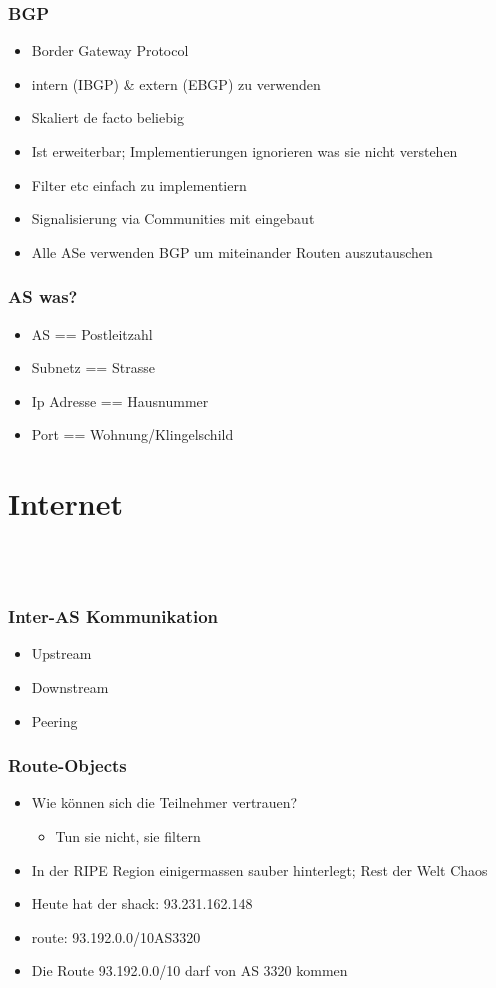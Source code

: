 \documentclass[t]{beamer}
\begin{document}
\begin{frame}
	\frametitle{BGP}
	\begin{itemize}
		\item Border Gateway Protocol
		\item intern (IBGP) \& extern (EBGP) zu verwenden
		\item Skaliert de facto beliebig
		\item Ist erweiterbar; Implementierungen ignorieren was sie nicht verstehen
		\item Filter etc einfach zu implementiern
		\item Signalisierung via Communities mit eingebaut
		\item Alle ASe verwenden BGP um miteinander Routen auszutauschen
	\end{itemize}
\end{frame}

\begin{frame}
	\frametitle{AS was?}
	\begin{itemize}
		\item AS == Postleitzahl
		\item Subnetz == Strasse
		\item Ip Adresse == Hausnummer
		\item Port == Wohnung/Klingelschild
	\end{itemize}
\end{frame}


\section{Internet}

\subsection{\ }

\begin{frame}
	\frametitle{Inter-AS Kommunikation}
	\begin{itemize}
		\item Upstream
		\item Downstream
		\item Peering
	\end{itemize}
\end{frame}

\begin{frame}
	\frametitle{Route-Objects}
	\begin{itemize}
		\item Wie k\"onnen sich die Teilnehmer vertrauen?
		\begin{itemize}
			\item Tun sie nicht, sie filtern
		\end{itemize}
		\item In der RIPE Region einigermassen sauber hinterlegt; Rest der Welt Chaos
		\item Heute hat der shack: 93.231.162.148
		\item route: 93.192.0.0/10AS3320
		\item Die Route 93.192.0.0/10 darf von AS 3320 kommen
	\end{itemize}
\end{frame}
\end{document}
